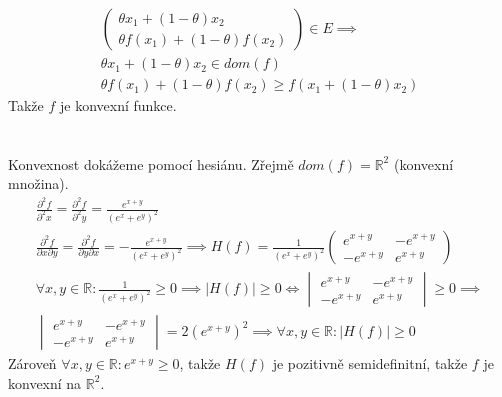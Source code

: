 \documentclass[10pt, a4paper]{article}
\begin{document}
\begin{gather*}
\begin{pmatrix} \theta x_1 + (1-\theta) x_2 \\ \theta f(x_1) + (1-\theta) f(x_2)\end{pmatrix} \in E \implies\\
\theta x_1 + (1-\theta) x_2 \in dom(f)\\
\theta f(x_1) + (1-\theta) f(x_2) \geq f( x_1 + (1-\theta) x_2)
\end{gather*}
Takže $f$ je konvexní funkce.

\section{}
Konvexnost dokážeme pomocí hesiánu. Zřejmě $dom(f) = \mathbb{R}^2$ (konvexní množina).
\begin{gather*}
\frac{\partial^2 f}{\partial^2 x} =  \frac{\partial^2 f}{\partial^2 y} = \frac{e^{x+y}}{(e^x+e^y)^2}\\
\frac{\partial^2 f}{\partial x \partial y} = \frac{\partial^2 f}{\partial y \partial x} = -\frac{e^{x+y}}{(e^x+e^y)^2} \implies
H(f) = \frac{1}{(e^x+e^y)^2}
\begin{pmatrix}
e^{x+y} & -e^{x+y}\\
-e^{x+y} & e^{x+y}
\end{pmatrix}\\
\forall x,y \in \mathbb{R}: \frac{1}{(e^x+e^y)^2} \geq 0 \implies
|H(f)| \geq 0 \iff 
\begin{vmatrix}
e^{x+y} & -e^{x+y}\\
-e^{x+y} & e^{x+y}
\end{vmatrix} \geq 0 \implies\\
\begin{vmatrix}
e^{x+y} & -e^{x+y}\\
-e^{x+y} & e^{x+y}
\end{vmatrix} = 2(e^{x+y})^2 \implies \forall x,y \in \mathbb{R}: |H(f)| \geq 0
\end{gather*}
Zároveň $\forall x,y \in \mathbb{R}: e^{x+y} \geq 0$, takže $H(f)$ je pozitivně semidefinitní, takže $f$ je konvexní na $\mathbb{R}^2$.
\end{document}
